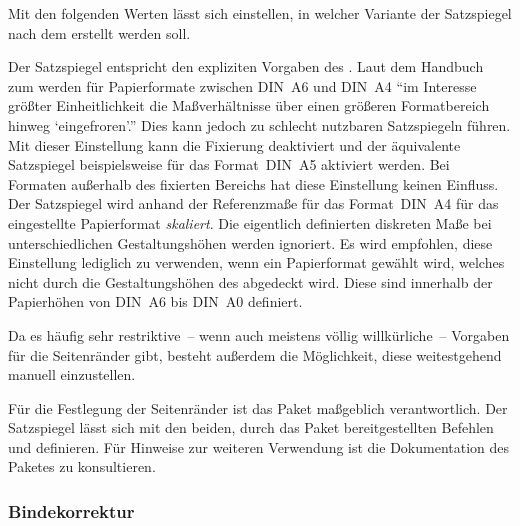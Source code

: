 \begin{DeclareEntity*}{}
\begin{DeclareEntity*}{}
\begin{DeclareEntity*}{}
\begin{Declaration}
%
Mit den folgenden Werten lässt sich einstellen, in welcher Variante der 
Satzspiegel nach dem \TUDCD erstellt werden soll.
%
\begin{DeclareValues}{}
  Der Satzspiegel entspricht den expliziten Vorgaben des \CDs.
  Laut dem Handbuch zum \CD werden für Papierformate zwischen DIN~A6 und DIN~A4 
  \enquote{im Interesse größter Einheitlichkeit die Maßverhältnisse über einen 
  größeren Formatbereich hinweg \enquote{eingefroren}.} Dies kann jedoch zu 
  schlecht nutzbaren Satzspiegeln führen. Mit dieser Einstellung kann die 
  Fixierung deaktiviert und der äquivalente Satzspiegel beispielsweise für das 
  Format~DIN~A5 aktiviert werden. Bei Formaten außerhalb des fixierten Bereichs 
  hat diese Einstellung keinen Einfluss. 
  Der Satzspiegel wird anhand der Referenzmaße für das Format~DIN~A4 für das 
  eingestellte Papierformat \emph{skaliert}. Die eigentlich definierten 
  diskreten Maße bei unterschiedlichen Gestaltungshöhen werden ignoriert. Es 
  wird empfohlen, diese Einstellung lediglich zu verwenden, wenn ein 
  Papierformat gewählt wird, welches nicht durch die Gestaltungshöhen des 
  \TUDCDs abgedeckt wird. Diese sind innerhalb der Papierhöhen von DIN~A6 bis 
  DIN~A0 definiert.
\end{DeclareValues}

%
Da es häufig sehr restriktive~-- wenn auch meistens völlig willkürliche~-- 
Vorgaben für die Seitenränder gibt, besteht außerdem die Möglichkeit, diese 
weitestgehend manuell einzustellen. 
%
\begin{DeclareValues}{}
  Für die Festlegung der Seitenränder ist das Paket  
  maßgeblich verantwortlich. Der Satzspiegel lässt sich mit den beiden, durch 
  das Paket bereitgestellten Befehlen  und  
  definieren. Für Hinweise zur weiteren Verwendung ist die Dokumentation des 
  Paketes zu konsultieren.
\end{DeclareValues}
\end{Declaration}


\subsubsection{%
  Bindekorrektur%
}


\end{DeclareEntity*}
\end{DeclareEntity*}
\end{DeclareEntity*}
